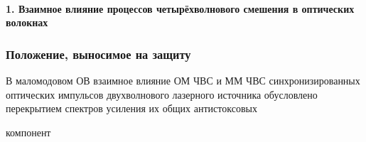 \begin{frame}
	\justifying
	\framesubtitle{1. Взаимное влияние процессов четырёхволнового смешения в оптических волокнах}
	\frametitle{Положение, выносимое на защиту}
	\large
	
	В маломодовом ОВ взаимное влияние ОМ ЧВС и ММ ЧВС синхронизированных оптических импульсов двухволнового лазерного источника обусловлено перекрытием спектров усиления их общих антистоксовых\par компонент
	
	
\end{frame}